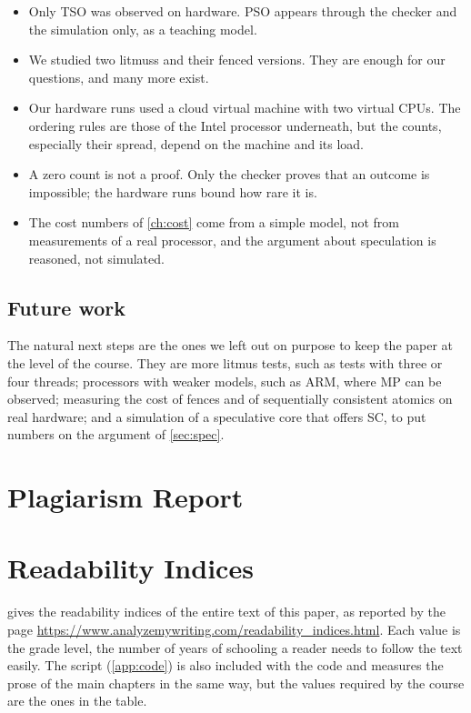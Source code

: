 \begin{itemize}
\item Only TSO was observed on hardware. PSO appears through the checker and the simulation only, as a teaching model.
\item We studied two \gls{litmus}s and their fenced versions. They are enough for our questions, and many more exist.
\item Our hardware runs used a cloud virtual machine with two virtual CPUs. The ordering rules are those of the Intel processor underneath, but the counts, especially their spread, depend on the machine and its load.
\item A zero count is not a proof. Only the checker proves that an outcome is impossible; the hardware runs bound how rare it is.
\item The cost numbers of \cref{ch:cost} come from a simple model, not from measurements of a real processor, and the argument about speculation is reasoned, not simulated.
\end{itemize}

\section{Future work}

The natural next steps are the ones we left out on purpose to keep the paper at the level of the course. They are more litmus tests, such as tests with three or four threads; processors with weaker models, such as ARM, where MP  can be observed; measuring the cost of fences and of sequentially consistent atomics on real hardware; and a simulation of a speculative core that offers SC, to put numbers on the argument of \cref{sec:spec}.

\appendix
\chapter{Plagiarism Report}
\label{app:plag}


\chapter{Readability Indices}
\label{app:read}

 gives the readability indices of the entire text of this paper, as reported by the page \url{https://www.analyzemywriting.com/readability_indices.html}. Each value is the grade level, the number of years of schooling a reader needs to follow the text easily. The script  (\cref{app:code}) is also included with the code and measures the prose of the main chapters in the same way, but the values required by the course are the ones in the table.

